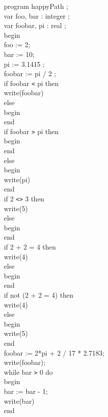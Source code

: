 \documentclass[12pt]{scrreprt}
\newcommand{\tab}{\hspace*{2em}}
\begin{document}
program happyPath ; \\
var foo, bar : integer ;\\
var foobar, pi : real ;\\
begin\\
\tab	foo := 2;\\
\tab	bar := 10;\\
\tab	pi := 3.1415 ;\\
\tab	foobar := pi / 2 ;\\
\tab	if foobar \verb|<| pi then\\
\tab\tab		write(foobar)\\
\tab	else\\
\tab\tab		begin\\
\tab\tab	end\\
\tab	if foobar \verb|>| pi then\\
\tab\tab		begin\\
\tab\tab 		end\\
\tab	else\\
\tab\tab		begin\\
\tab\tab\tab			write(pi)\\
\tab\tab		end\\
\tab	if 2 \verb|<|\verb|>| 3 then\\
\tab\tab		write(5)\\
\tab	else\\
\tab\tab		begin\\
\tab\tab		end\\
\tab	if 2 + 2 = 4 then\\
\tab\tab		write(4)\\
\tab	else\\
\tab\tab		begin\\
\tab\tab		end\\
\tab	if not (2 + 2 = 4) then\\
\tab\tab		write(4)\\
\tab	else\\
\tab\tab		begin\\
\tab\tab		write(5)\\
\tab\tab		end\\
\tab	foobar := 2*pi + 2 / 17 * 2.7183;\\
\tab	write(foobar);\\
\tab	while bar \verb|>| 0 do\\
\tab	begin\\
\tab\tab		bar := bar - 1;\\
\tab\tab		write(bar)\\
\tab	end\\
	\\
\end{document}
